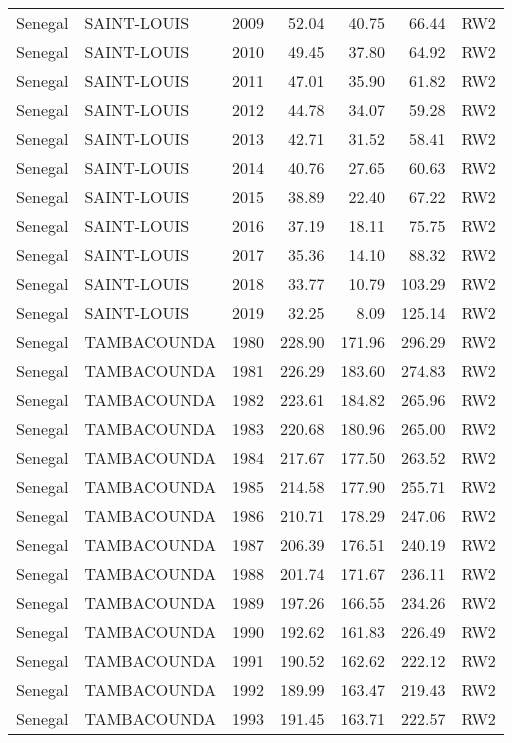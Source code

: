 \begin{longtable}{lllrrrl}
  Senegal & SAINT-LOUIS & 2009 & 52.04 & 40.75 & 66.44 & RW2 \\ 
  Senegal & SAINT-LOUIS & 2010 & 49.45 & 37.80 & 64.92 & RW2 \\ 
  Senegal & SAINT-LOUIS & 2011 & 47.01 & 35.90 & 61.82 & RW2 \\ 
  Senegal & SAINT-LOUIS & 2012 & 44.78 & 34.07 & 59.28 & RW2 \\ 
  Senegal & SAINT-LOUIS & 2013 & 42.71 & 31.52 & 58.41 & RW2 \\ 
  Senegal & SAINT-LOUIS & 2014 & 40.76 & 27.65 & 60.63 & RW2 \\ 
  Senegal & SAINT-LOUIS & 2015 & 38.89 & 22.40 & 67.22 & RW2 \\ 
  Senegal & SAINT-LOUIS & 2016 & 37.19 & 18.11 & 75.75 & RW2 \\ 
  Senegal & SAINT-LOUIS & 2017 & 35.36 & 14.10 & 88.32 & RW2 \\ 
  Senegal & SAINT-LOUIS & 2018 & 33.77 & 10.79 & 103.29 & RW2 \\ 
  Senegal & SAINT-LOUIS & 2019 & 32.25 & 8.09 & 125.14 & RW2 \\ 
  Senegal & TAMBACOUNDA & 1980 & 228.90 & 171.96 & 296.29 & RW2 \\ 
  Senegal & TAMBACOUNDA & 1981 & 226.29 & 183.60 & 274.83 & RW2 \\ 
  Senegal & TAMBACOUNDA & 1982 & 223.61 & 184.82 & 265.96 & RW2 \\ 
  Senegal & TAMBACOUNDA & 1983 & 220.68 & 180.96 & 265.00 & RW2 \\ 
  Senegal & TAMBACOUNDA & 1984 & 217.67 & 177.50 & 263.52 & RW2 \\ 
  Senegal & TAMBACOUNDA & 1985 & 214.58 & 177.90 & 255.71 & RW2 \\ 
  Senegal & TAMBACOUNDA & 1986 & 210.71 & 178.29 & 247.06 & RW2 \\ 
  Senegal & TAMBACOUNDA & 1987 & 206.39 & 176.51 & 240.19 & RW2 \\ 
  Senegal & TAMBACOUNDA & 1988 & 201.74 & 171.67 & 236.11 & RW2 \\ 
  Senegal & TAMBACOUNDA & 1989 & 197.26 & 166.55 & 234.26 & RW2 \\ 
  Senegal & TAMBACOUNDA & 1990 & 192.62 & 161.83 & 226.49 & RW2 \\ 
  Senegal & TAMBACOUNDA & 1991 & 190.52 & 162.62 & 222.12 & RW2 \\ 
  Senegal & TAMBACOUNDA & 1992 & 189.99 & 163.47 & 219.43 & RW2 \\ 
  Senegal & TAMBACOUNDA & 1993 & 191.45 & 163.71 & 222.57 & RW2 \\ 

\end{longtable}
